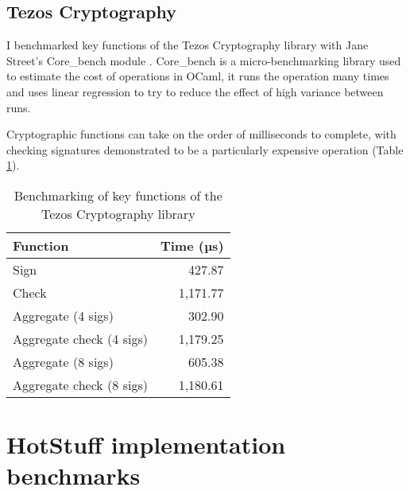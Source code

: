 \subsection{Tezos Cryptography} \label{tezosbenchmark}
I benchmarked key functions of the Tezos Cryptography library \cite{tezosCrypto} with Jane Street's Core\_bench module \cite{janestreetCoreBench2023}. Core\_bench is a micro-benchmarking library used to estimate the cost of operations in OCaml, it runs the operation many times and uses linear regression to try to reduce the effect of high variance between runs.

Cryptographic functions can take on the order of milliseconds to complete, with checking signatures demonstrated to be a particularly expensive operation (Table \ref{tezostable}).

\begin{table}[!h]
	\centering
	\begin{tabular}{|l|r|}
	\hline
	Function                 & Time (µs) \\ \hline
	Sign                     & 427.87   \\
	Check                    & 1,171.77 \\
	Aggregate (4 sigs)       & 302.90   \\
	Aggregate check (4 sigs) & 1,179.25 \\
	Aggregate (8 sigs)       & 605.38   \\
	Aggregate check (8 sigs) & 1,180.61 \\ \hline
	\end{tabular}
	\caption{Benchmarking of key functions of the Tezos Cryptography library}
	\label{tezostable}
\end{table}

\section{HotStuff implementation benchmarks} \label{hotstuffbenchmarks}


